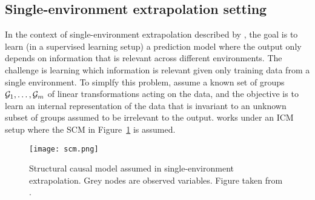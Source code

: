 \subsection{Single-environment extrapolation setting}

In the context of single-environment extrapolation described by \textcite{Mouli:2021}, the goal is to learn (in a supervised learning setup) a prediction model where the output  only depends on information that is relevant across different environments. The challenge is learning which information is relevant given only training data from a single environment. To simplfy this problem, \citeauthor{Mouli:2021} assume a known set of groups $\mathcal{G}_1,\ldots,\mathcal{G}_m$ of linear transformations acting on the data, and the objective is to learn an internal representation of the data that is invariant to an unknown subset of groups assumed to be irrelevant to the output. \citeauthor{Mouli:2021} works under an ICM setup where the SCM in Figure~\ref{fig:scm} is assumed.

\begin{figure}[H]
\centering
\texttt{[image: scm.png]}
\caption{Structural causal model assumed in single-environment extrapolation. Grey nodes are observed variables. Figure taken from \parencite{Mouli:2021}.}
\label{fig:scm}
\end{figure}

